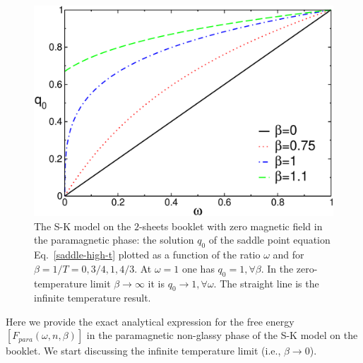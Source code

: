 \documentclass[twocolumn,superscriptaddress,prb,10pt]{revtex4-1}
\begin{document}
\begin{figure}[t]
\includegraphics*[width=0.9\linewidth]{./draft_figs/RSB0_saddle_ht}
\caption{
 The S-K model on the $2$-sheets booklet with zero magnetic field in the 
 paramagnetic phase: the solution $q_0$ of the saddle point equation 
 Eq.~\eqref{saddle-high-t} plotted as a function of the ratio 
 $\omega$ and for $\beta=1/T=0,3/4,1,4/3$. At $\omega=1$ one has 
 $q_0=1,\forall\beta$. In the zero-temperature limit $\beta\to\infty$ 
 it is $q_0\to 1,\forall\omega$. The straight line is the infinite 
 temperature result. 
}
\label{RSB0_saddle_ht}
\end{figure}

Here we provide the exact analytical expression for the free energy 
$[F_{para}(\omega,n,\beta)]$  in the paramagnetic non-glassy phase of 
the S-K model on the booklet. We start discussing the infinite temperature 
limit (i.e., $\beta\to 0$). 
\end{document}

